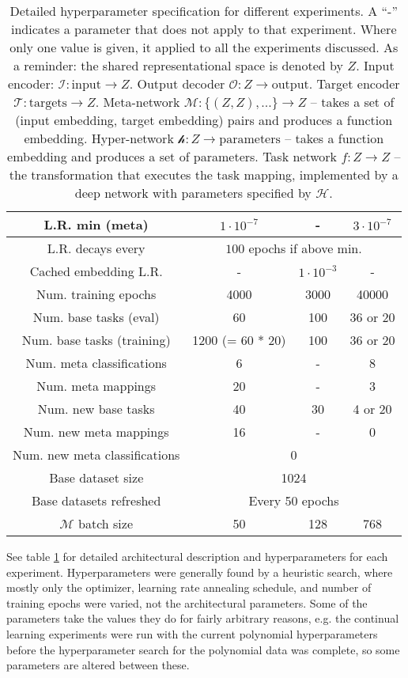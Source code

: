 \documentclass{article}
\begin{document}
\begin{table}
\begin{tabular}{|c||c|c|c|}
L.R. min (meta) & $1 \cdot 10^{-7}$& - & $3 \cdot 10^{-7}$ \\\hline
L.R. decays every & \multicolumn{3}{c|}{$100$ epochs if above min.} \\\hline
Cached embedding L.R. & - & $1\cdot 10^{-3}$ & -\\\hline
Num. training epochs & 4000 & 3000 & 40000 \\\hline
\hline
Num. base tasks (eval) & 60 & 100 & 36 or 20 \\\hline
Num. base tasks (training) & 1200 (= 60 * 20) & 100 & 36 or 20  \\\hline
Num. meta classifications & 6 & - & 8  \\\hline
Num. meta mappings & 20 & - & 3  \\\hline
Num. new base tasks & 40 & 30 & 4 or 20 \\\hline 
Num. new meta mappings & 16 & - & 0  \\\hline
Num. new meta classifications &  \multicolumn{3}{c|}{0} \\\hline
Base dataset size & \multicolumn{3}{c|}{1024} \\\hline
Base datasets refreshed & \multicolumn{3}{c|}{Every 50 epochs} \\\hline
$\mathcal{M}$ batch size & 50 & 128 & 768 \\\hline
\end{tabular}
\caption{Detailed hyperparameter specification for different experiments. A ``-'' indicates a parameter that does not apply to that experiment. Where only one value is given, it applied to all the experiments discussed. As a reminder: the shared representational space is denoted by $Z$. Input encoder: $\mathcal{I}: \text{input} \rightarrow Z$. Output decoder $\mathcal{O}: Z \rightarrow \text{output}$. Target encoder $\mathcal{T}: \text{targets} \rightarrow Z$. Meta-network $\mathcal{M}: \{(Z, Z), ...\} \rightarrow Z $ -- takes a set of (input embedding, target embedding) pairs and produces a function embedding. Hyper-network $\mathcal{h}: Z \rightarrow \text{parameters}$ -- takes a function embedding and produces a set of parameters. Task network $f: Z \rightarrow Z$ -- the transformation that executes the task mapping, implemented by a deep network with parameters specified by $\mathcal{H}$.} \label{supp_hyperparameter_table}
\end{table}
See table \ref{supp_hyperparameter_table} for detailed architectural description and hyperparameters for each experiment. Hyperparameters were generally found by a heuristic search, where mostly only the optimizer, learning rate annealing schedule, and number of training epochs were varied, not the architectural parameters. Some of the parameters take the values they do for fairly arbitrary reasons, e.g. the continual learning experiments were run with the current polynomial hyperparameters before the hyperparameter search for the polynomial data was complete, so some parameters are altered between these. \par
\end{document}
